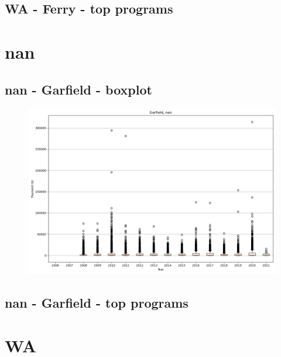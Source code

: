 \subsection*{WA - Ferry - top programs}

\newpage
\section*{nan}
\subsection*{nan - Garfield - boxplot}
\begin{figure}[h]
\centering
\includegraphics[width=7in]{../output/boxplots/counties/Garfield-nan_boxplot.png}
\end{figure}


\subsection*{nan - Garfield - top programs}

\newpage
\section*{WA}
